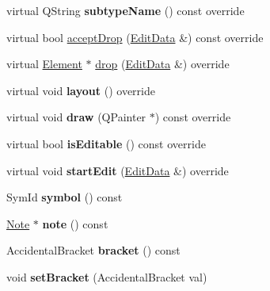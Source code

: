 \begin{DoxyCompactItemize}
virtual Q\+String {\bfseries subtype\+Name} () const override
\item 
virtual bool \hyperlink{class_ms_1_1_accidental_a2f343b18d3b10a4fa5e87c35afe80f58}{accept\+Drop} (\hyperlink{class_ms_1_1_edit_data}{Edit\+Data} \&) const override
\item 
virtual \hyperlink{class_ms_1_1_element}{Element} $\ast$ \hyperlink{class_ms_1_1_accidental_acdbf43ac373defb983202d4f7c8e3555}{drop} (\hyperlink{class_ms_1_1_edit_data}{Edit\+Data} \&) override
\item 
\mbox{\label{class_ms_1_1_accidental_a3c4e78a770ad6163c6502551829249d1}} 
virtual void {\bfseries layout} () override
\item 
\mbox{\label{class_ms_1_1_accidental_a8e5d8a32846ea3d77f3bf91cea764071}} 
virtual void {\bfseries draw} (Q\+Painter $\ast$) const override
\item 
\mbox{\label{class_ms_1_1_accidental_a5a379af242c9c0e86583b0cc2857be97}} 
virtual bool {\bfseries is\+Editable} () const override
\item 
\mbox{\label{class_ms_1_1_accidental_a3e5a3dec44a9de4a4b955ce43e472c5a}} 
virtual void {\bfseries start\+Edit} (\hyperlink{class_ms_1_1_edit_data}{Edit\+Data} \&) override
\item 
\mbox{\label{class_ms_1_1_accidental_a6068f72a92f62c8111e9c36b73bdd732}} 
Sym\+Id {\bfseries symbol} () const
\item 
\mbox{\label{class_ms_1_1_accidental_a995a4d148a23411af038e4e748373435}} 
\hyperlink{class_ms_1_1_note}{Note} $\ast$ {\bfseries note} () const
\item 
\mbox{\label{class_ms_1_1_accidental_afa127dd78be08a230b632d7bc09a1c53}} 
Accidental\+Bracket {\bfseries bracket} () const
\item 
\mbox{\label{class_ms_1_1_accidental_a4797d13e75e920058b2bd24fbd7a8a28}} 
void {\bfseries set\+Bracket} (Accidental\+Bracket val)
\item 
\mbox{\label{class_ms_1_1_accidental_a868a396c628c97f35c929623bbe4561c}} 

\end{DoxyCompactItemize}
